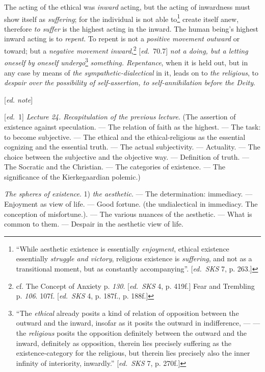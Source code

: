 \documentclass[12pt,a4paper,openany]{book}
\newcommand{\kpage}[1]{\marginnote{\footnotesize\textit{[#1]}}}
\newcommand{\ed}[1]{{\small[\textit{ed.}\ #1]}}
\newcommand{\ednote}[1]{{\small[\textit{ed. note}]}}
\begin{document}
The acting of the ethical was \emph{inward} acting, but the acting of inwardness
must show itself as \emph{suffering}; for the individual is not able to\footnote[64]{
``While aesthetic existence is essentially \emph{enjoyment}, ethical existence essentially
\emph{struggle and victory}, religious existence is \emph{suffering}, and not as a transitional moment, but
as constantly accompanying''. \ed{\emph{SKS} 7, p. 263.}}
create itself anew, therefore \emph{to suffer} is the highest acting in the inward.
The human being's highest inward acting is to \emph{repent}. To repent is
not a \emph{positive movement outward} or toward; but a \emph{negative movement
inward},\footnote[65]{
cf. The Concept of Anxiety p. \emph{130}. \ed{\emph{SKS} 4, p. 419f.} Fear and Trembling p. \emph{106}. 107f. \ed{\emph{SKS} 4,
p. 187f., p. 188f.}}
\ed{70.7} \emph{not a doing, but a letting oneself by oneself undergo}\footnote[66]{
``The \emph{ethical} already posits a kind of relation of opposition between the outward
and the inward, insofar as it posits the outward in indifference, --- --- the \emph{religious}
posits the opposition definitely between the outward and the inward, definitely as
opposition, therein lies precisely suffering as the existence-category for the religious,
but therein lies precisely also the inner infinity of interiority, inwardly.'' \ed{\emph{SKS} 7,
p. 270f.}}
\emph{something. Repentance}\kpage{136},
when it is held out, but in any case by means of \emph{the sympathetic-dialectical}
in it, leads on to \emph{the religious}, to \emph{despair over the possibility of
self-assertion, to self-annihilation before the Deity}.

\ednote{}

\ed{1} \emph{Lecture 24. Recapitulation of the previous lecture}. (The
assertion of existence against speculation. --- The relation of faith as the highest.
--- The task: to become subjective. --- The ethical and the ethical-religious
as the essential cognizing and the essential truth. ---
The actual subjectivity. --- Actuality. --- The choice between the
subjective and the objective way. --- Definition of truth. ---
The Socratic and the Christian. --- The categories of existence. --- The significance
of the Kierkegaardian polemic.)

\emph{The spheres of existence}. 1) \emph{the aesthetic}. --- The determination: immediacy.
--- Enjoyment as view of life. --- Good fortune. (the undialectical in immediacy.
The conception of misfortune.). --- The various nuances of the
aesthetic. --- What is common to them. --- Despair in the aesthetic
view of life.
\end{document}
